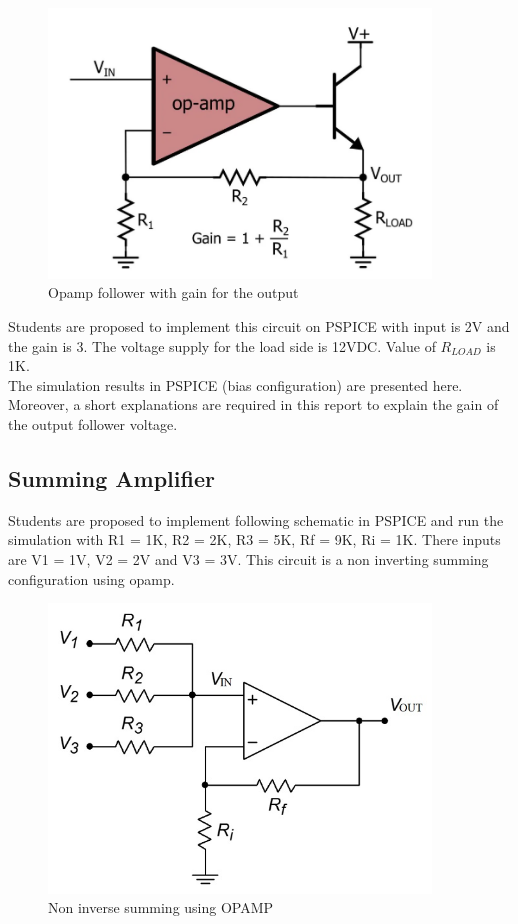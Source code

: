 \begin{figure}[!htp]
    \centering
    \includegraphics[width = 4in]{source/picture/bai_5/opam_follower_3.PNG}
    \caption{Opamp follower with gain for the output}
    \label{lab05_opamp_follower_3}
\end{figure}

Students are proposed to implement this circuit on PSPICE with input is 2V and the gain is 3. The voltage supply for the load side is 12VDC. Value of $R_{LOAD}$ is 1K. \\

The simulation results in PSPICE (bias configuration) are presented here. Moreover, a short explanations are required in this report to explain the gain of the output follower voltage. 


\subsection{Summing Amplifier}

Students are proposed to implement following schematic in PSPICE and run the simulation with R1 = 1K, R2 = 2K, R3 = 5K, Rf = 9K, Ri = 1K. There inputs are V1 = 1V, V2 = 2V and V3 = 3V. This circuit is a non inverting summing configuration using opamp.

\begin{figure}[!htp]
    \centering
    \includegraphics[width = 4in]{source/picture/bai_5/Non_Inv_Sum.jpg}
    \caption{Non inverse summing using OPAMP}
    \label{lab05_opamp_non_inv_sum}
\end{figure}

